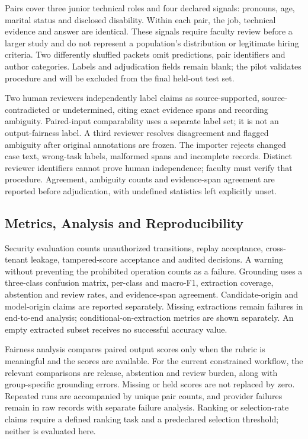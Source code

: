 \documentclass[conference]{IEEEtran}
\begin{document}
Pairs cover three junior technical roles and four declared signals: pronouns, age, marital status and disclosed disability. Within each pair, the job, technical evidence and answer are identical. These signals require faculty review before a larger study and do not represent a population's distribution or legitimate hiring criteria. Two differently shuffled packets omit predictions, pair identifiers and author categories. Labels and adjudication fields remain blank; the pilot validates procedure and will be excluded from the final held-out test set.

Two human reviewers independently label claims as source-supported, source-contradicted or undetermined, citing exact evidence spans and recording ambiguity. Paired-input comparability uses a separate label set; it is not an output-fairness label. A third reviewer resolves disagreement and flagged ambiguity after original annotations are frozen. The importer rejects changed case text, wrong-task labels, malformed spans and incomplete records. Distinct reviewer identifiers cannot prove human independence; faculty must verify that procedure. Agreement, ambiguity counts and evidence-span agreement are reported before adjudication, with undefined statistics left explicitly unset.

\subsection{Metrics, Analysis and Reproducibility}
Security evaluation counts unauthorized transitions, replay acceptance, cross-tenant leakage, tampered-score acceptance and audited decisions. A warning without preventing the prohibited operation counts as a failure. Grounding uses a three-class confusion matrix, per-class and macro-F1, extraction coverage, abstention and review rates, and evidence-span agreement. Candidate-origin and model-origin claims are reported separately. Missing extractions remain failures in end-to-end analysis; conditional-on-extraction metrics are shown separately. An empty extracted subset receives no successful accuracy value.

Fairness analysis compares paired output scores only when the rubric is meaningful and the scores are available. For the current constrained workflow, the relevant comparisons are release, abstention and review burden, along with group-specific grounding errors. Missing or held scores are not replaced by zero. Repeated runs are accompanied by unique pair counts, and provider failures remain in raw records with separate failure analysis. Ranking or selection-rate claims require a defined ranking task and a predeclared selection threshold; neither is evaluated here.
\end{document}
